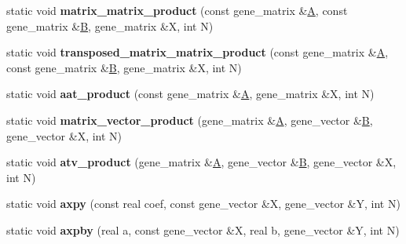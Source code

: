 \begin{DoxyCompactItemize}
static void {\bfseries matrix\+\_\+matrix\+\_\+product} (const gene\+\_\+matrix \&\hyperlink{group___core___module_class_eigen_1_1_matrix}{A}, const gene\+\_\+matrix \&\hyperlink{group___core___module_class_eigen_1_1_matrix}{B}, gene\+\_\+matrix \&X, int N)
\item 
\mbox{\label{classmtl4__interface_a6a1fe4d2ffe7d5dba7ef6383f109eed5}} 
static void {\bfseries transposed\+\_\+matrix\+\_\+matrix\+\_\+product} (const gene\+\_\+matrix \&\hyperlink{group___core___module_class_eigen_1_1_matrix}{A}, const gene\+\_\+matrix \&\hyperlink{group___core___module_class_eigen_1_1_matrix}{B}, gene\+\_\+matrix \&X, int N)
\item 
\mbox{\label{classmtl4__interface_ab516084fc8d5460c76bcd987a782388d}} 
static void {\bfseries aat\+\_\+product} (const gene\+\_\+matrix \&\hyperlink{group___core___module_class_eigen_1_1_matrix}{A}, gene\+\_\+matrix \&X, int N)
\item 
\mbox{\label{classmtl4__interface_afdbeb5505a83d59bb5c0baa4d77d6d13}} 
static void {\bfseries matrix\+\_\+vector\+\_\+product} (gene\+\_\+matrix \&\hyperlink{group___core___module_class_eigen_1_1_matrix}{A}, gene\+\_\+vector \&\hyperlink{group___core___module_class_eigen_1_1_matrix}{B}, gene\+\_\+vector \&X, int N)
\item 
\mbox{\label{classmtl4__interface_abecd88134cb94d6428a21042cdf3fb5e}} 
static void {\bfseries atv\+\_\+product} (gene\+\_\+matrix \&\hyperlink{group___core___module_class_eigen_1_1_matrix}{A}, gene\+\_\+vector \&\hyperlink{group___core___module_class_eigen_1_1_matrix}{B}, gene\+\_\+vector \&X, int N)
\item 
\mbox{\label{classmtl4__interface_abbfa2f205b4636923dff7ae12d6c45b4}} 
static void {\bfseries axpy} (const real coef, const gene\+\_\+vector \&X, gene\+\_\+vector \&Y, int N)
\item 
\mbox{\label{classmtl4__interface_af925280e0c44856358a54d81a34aad09}} 
static void {\bfseries axpby} (real a, const gene\+\_\+vector \&X, real b, gene\+\_\+vector \&Y, int N)
\item 
\mbox{\label{classmtl4__interface_a51283dd52248d281f0e9f47a6ced9824}} 

\end{DoxyCompactItemize}

